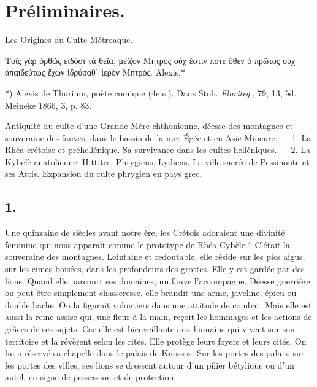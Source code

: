 \documentclass[a4paper, 11pt, oneside, polutonikogreek, french]{article}
\begin{document}
\section{Préliminaires.}
\begin{center}
Les Origines du Culte Métroaque.
\end{center}
Τοῖς γὰρ ὁρθῶς εἰδόσι  
τὰ θεῖα, μεῖζον Μητρὸς οὐχ ἔστιν ποτέ  
ὅθεν ὁ πρῶτος οὐχ ἀπαιδεύτως ἔχων  
ἱδρύσαθ᾽ ἱερὸν Μητρός.  
Alexis.*

*) Alexis de Thurium, poète comique (4e s.). Dans Stob. \emph{Floriteg.}, 79, 13, èd. Meineke 1866, 3, p. 83.

Antiquité du culte d'une Grande Mère chthonienne, déesse des montagnes et souveraine des fauves, dans le bassin de la mer Égée et en Asie Mineure. --- 1. La Rhéa crétoise et préhellénique. Sa survivance dans les cultes helléniques. --- 2. La Kybelè anatolienne. Hittites, Phrygiens, Lydiens. La ville sacrée de Pessinonte et ses Attis. Expansion du culte phrygien en pays grec.

\subsection{1.}

Une quinzaine de siècles avant notre ère, les Crétois adoraient une divinité féminine qui nous apparaît comme le prototype de Rhéa-Cybèle.* C'était la souveraine des montagnes. Lointaine et redoutable, elle réside sur les pics aigus, sur les cimes boisées, dans les profondeurs des grottes. Elle y est gardée par des lions. Quand elle parcourt ses domaines, un fauve l'accompagne. Déesse guerrière ou peut-être simplement chasseresse, elle brandit une arme, javeline, épieu ou double hache. On la figurait volontiers dans une attitude de combat. Mais elle est aussi la reine assise qui, une fleur à la main, reçoit les hommages et les actions de grâces de ses sujets. Car elle est bienveillante aux humains qui vivent sur son territoire et la révèrent selon les rites. Elle protège leurs foyers et leurs cités. On lui a réservé sa chapelle dans le palais de Knossos. Sur les portes des palais, sur les portes des villes, ses lions se dressent autour d'un pilier bétylique ou d'un autel, en signe de possession et de protection.
\end{document}

